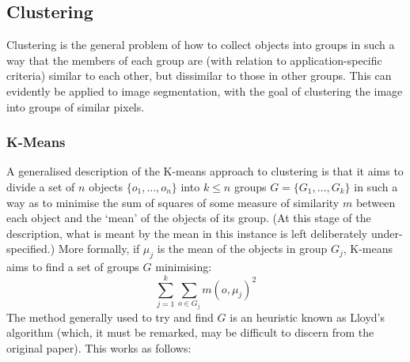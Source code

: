


\subsection{Clustering}

Clustering is the general problem of how to collect objects into groups in such a way that the members of each group are (with relation to application-specific criteria) similar to each other, but dissimilar to those in other groups. This can evidently be applied to image segmentation, with the goal of clustering the image into groups of similar pixels.

\subsubsection{K-Means}


A generalised description of the K-means approach to clustering is that it aims to divide a set of $n$ objects $\{o_1,\ldots,o_n\}$ into $k \le n$ groups $G = \{G_1,\ldots,G_k\}$ in such a way as to minimise the sum of squares of some measure of similarity $m$ between each object and the `mean' of the objects of its group. (At this stage of the description, what is meant by the mean in this instance is left deliberately under-specified.) More formally, if $\mu_j$ is the mean of the objects in group $G_j$, K-means aims to find a set of groups $G$ minimising:
%
\[
\sum_{j=1}^k \sum_{o \in G_j} m(o, \mu_j)^2
\]
%
The method generally used to try and find $G$ is an heuristic known as Lloyd's algorithm \cite{lloyd82} (which, it must be remarked, may be difficult to discern from the original paper). This works as follows:

